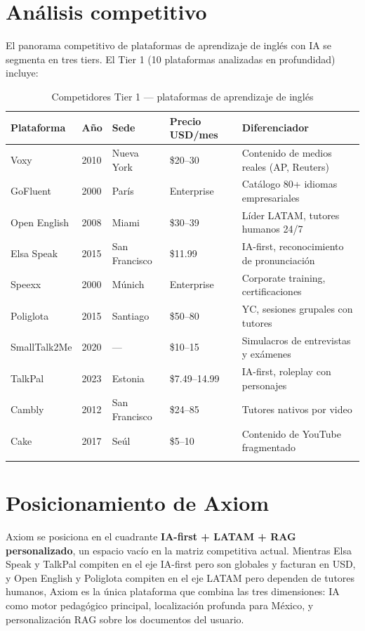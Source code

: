 \documentclass[10pt,a4paper,oneside]{report}
\begin{document}
\section{Análisis competitivo}
El panorama competitivo de plataformas de aprendizaje de inglés con IA se segmenta en tres tiers. El Tier 1 (10 plataformas analizadas en profundidad) incluye:

\begin{longtable}{p{2.4cm}p{1.5cm}p{2.2cm}p{2.5cm}p{3.5cm}}
\toprule
\textbf{Plataforma} & \textbf{Año} & \textbf{Sede} & \textbf{Precio USD/mes} & \textbf{Diferenciador} \\
\midrule
Voxy & 2010 & Nueva York & \$20--30 & Contenido de medios reales (AP, Reuters) \\
GoFluent & 2000 & París & Enterprise & Catálogo 80+ idiomas empresariales \\
Open English & 2008 & Miami & \$30--39 & Líder LATAM, tutores humanos 24/7 \\
Elsa Speak & 2015 & San Francisco & \$11.99 & IA-first, reconocimiento de pronunciación \\
Speexx & 2000 & Múnich & Enterprise & Corporate training, certificaciones \\
Poliglota & 2015 & Santiago & \$50--80 & YC, sesiones grupales con tutores \\
SmallTalk2Me & 2020 & --- & \$10--15 & Simulacros de entrevistas y exámenes \\
TalkPal & 2023 & Estonia & \$7.49--14.99 & IA-first, roleplay con personajes \\
Cambly & 2012 & San Francisco & \$24--85 & Tutores nativos por video \\
Cake & 2017 & Seúl & \$5--10 & Contenido de YouTube fragmentado \\
\bottomrule
\caption{Competidores Tier 1 — plataformas de aprendizaje de inglés}
\end{longtable}

\section{Posicionamiento de Axiom}
Axiom se posiciona en el cuadrante \textbf{IA-first + LATAM + RAG personalizado}, un espacio vacío en la matriz competitiva actual. Mientras Elsa Speak y TalkPal compiten en el eje IA-first pero son globales y facturan en USD, y Open English y Poliglota compiten en el eje LATAM pero dependen de tutores humanos, Axiom es la única plataforma que combina las tres dimensiones: IA como motor pedagógico principal, localización profunda para México, y personalización RAG sobre los documentos del usuario.
\end{document}
